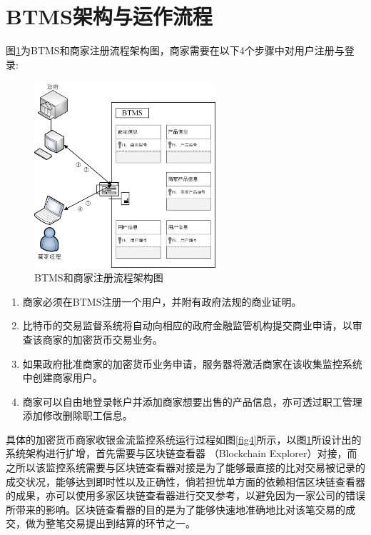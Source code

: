 \section{BTMS架构与运作流程}

	图\ref{fig3}为BTMS和商家注册流程架构图，商家需要在以下4个步骤中对用户注册与登录:

	\begin{figure}[!htbp]
		\centering
		\includegraphics[width = 0.6\textwidth]{fig3.jpg}
		\caption{BTMS和商家注册流程架构图}\label{fig3}
	\end{figure}

	\begin{enumerate}
		\item 商家必须在BTMS注册一个用户，并附有政府法规的商业证明。
		\item 比特币的交易监督系统将自动向相应的政府金融监管机构提交商业申请，以审查该商家的加密货币交易业务。
		\item 如果政府批准商家的加密货币业务申请，服务器将激活商家在该收集监控系统中创建商家用户。
		\item 商家可以自由地登录帐户并添加商家想要出售的产品信息，亦可透过职工管理添加修改删除职工信息。
	\end{enumerate}

	具体的加密货币商家收银金流监控系统运行过程如图\ref{fig4}所示，以图\ref{fig3}所设计出的系统架构进行扩增，首先需要与区块链查看器 （Blockchain Explorer）\supercite{Blockchainexplorer:Ananalyticalprocessandinvestigationenvironmentforbitcoin}对接，而之所以该监控系统需要与区块链查看器对接是为了能够最直接的比对交易被记录的成交状况，能够达到即时性以及正确性，倘若担忧单方面的依赖相信区块链查看器的成果，亦可以使用多家区块链查看器进行交叉参考，以避免因为一家公司的错误所带来的影响。区块链查看器的目的是为了能够快速地准确地比对该笔交易的成交，做为整笔交易提出到结算的环节之一。

